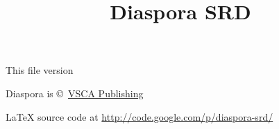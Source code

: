 \documentclass[10pt,letterpaper]{memoir}
\title{Diaspora SRD}
\begin{document}
\frontmatter
\maketitle

{
\thispagestyle{empty}
\vfill
\footnoterule
\footnotesize
This file version \LONGVERSION

Diaspora is \copyright~\href{http://www.vsca.ca/Diaspora}{VSCA Publishing}

\LaTeX{} source code at \url{http://code.google.com/p/diaspora-srd/}
}

\clearpage
\tableofcontents


\mainmatter











\backmatter

\appendix


\cleardoublepage
\printindex


\end{document}
